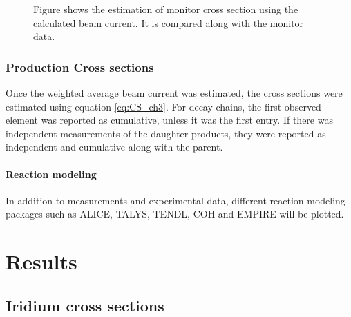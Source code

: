 \documentclass[a4paper,11pt,twoside]{book}
\begin{document}
\begin{figure}
    \quad
    \quad
    \caption{Figure shows the estimation of monitor cross section using the calculated beam current. It is compared along with the monitor data.  }%
    \label{fig:monitor_BC}%
\end{figure}



\subsection{Production Cross sections}

Once the weighted average beam current was estimated, the cross sections were estimated using equation \ref{eq:CS_ch3}. For decay chains, the first observed element was reported as cumulative, unless it was the first entry. If there was independent measurements of the daughter products, they were reported as independent and cumulative along with the parent. \\

\subsubsection{Reaction modeling}
In addition to measurements and experimental data, different reaction modeling packages such as ALICE, TALYS, TENDL, COH and EMPIRE will be plotted. 



\chapter{Results}\label{Chapter:Results}
\noindent

\section{Iridium cross sections}
\end{document}
